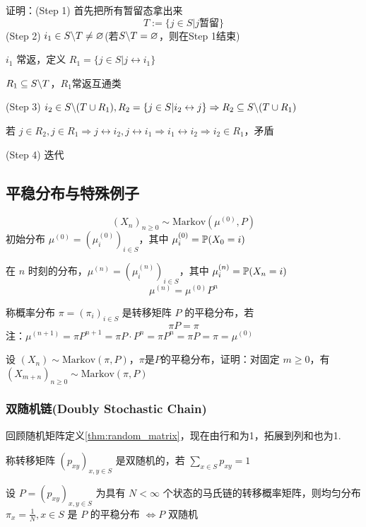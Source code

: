 证明：(Step 1) 首先把所有暂留态拿出来
\[
T:=\{j\in S|j\text{暂留}\}
\]
(Step 2) $i_1\in S\backslash T\neq \varnothing$(若$S\backslash T=\varnothing$，则在Step 1结束)

$i_1$ 常返，定义 $R_1=\{j\in S|j\leftrightarrow i_1\}$

$R_1\subseteq S\backslash T$，$R_1$常返互通类

(Step 3) $i_2\in S\backslash (T\cup R_1),R_2=\{j\in S|i_2\leftrightarrow j\}\Rightarrow R_2\subseteq S\backslash (T\cup R_1)$

若 $j\in R_2,j\in R_1\Rightarrow j\leftrightarrow i_2,j\leftrightarrow i_1\Rightarrow i_1\leftrightarrow i_2\Rightarrow i_2\in R_1$，矛盾

(Step 4) 迭代

\subsection{平稳分布与特殊例子}

\[
(X_n)_{n\geq 0}\sim \text{Markov}(\mu^{(0)},P)
\]
初始分布 $\mu^{(0)}=(\mu_i^{(0)})_{i\in S}$，其中 $\mu_i^{(0)}=\mathbb{P}(X_0=i)$

在 $n$ 时刻的分布，$\mu^{(n)}=(\mu_i^{(n)})_{i\in S}$，其中 $\mu_i^{(n)}=\mathbb{P}(X_n=i)$
\[
\mu^{(n)}=\mu^{(0)}P^n
\]
\begin{definition}[平稳分布]
    称概率分布 $\pi=(\pi_i)_{i\in S}$ 是转移矩阵 $P$ 的平稳分布，若
    \[
    \pi P=\pi
    \]
    注：$\mu^{(n+1)}=\pi P^{n+1}=\pi P\cdot P^n=\pi P^n=\pi P=\pi=\mu^{(0)}$
\end{definition}

\begin{problem}[作业6-4]
    设 $(X_n)\sim \text{Markov}(\pi,P)$，$\pi$是$P$的平稳分布，证明：对固定 $m\geq 0$，有 $(X_{m+n})_{n\geq 0}\sim \text{Markov}(\pi,P)$
\end{problem}

\subsubsection{双随机链(Doubly Stochastic Chain)}

回顾随机矩阵定义\ref{thm:random_matrix}，现在由行和为1，拓展到列和也为1.

\begin{definition}
    称转移矩阵 $(p_{xy})_{x,y\in S}$ 是双随机的，若 $\sum_{x\in S}p_{xy}=1$
\end{definition}

\begin{theorem}
    设 $P=(p_{xy})_{x,y\in S}$ 为具有 $N<\infty$ 个状态的马氏链的转移概率矩阵，则均匀分布 $\pi_x=\frac{1}{N},x\in S$ 是 $P$ 的平稳分布 $\Leftrightarrow P$ 双随机  
\end{theorem}

